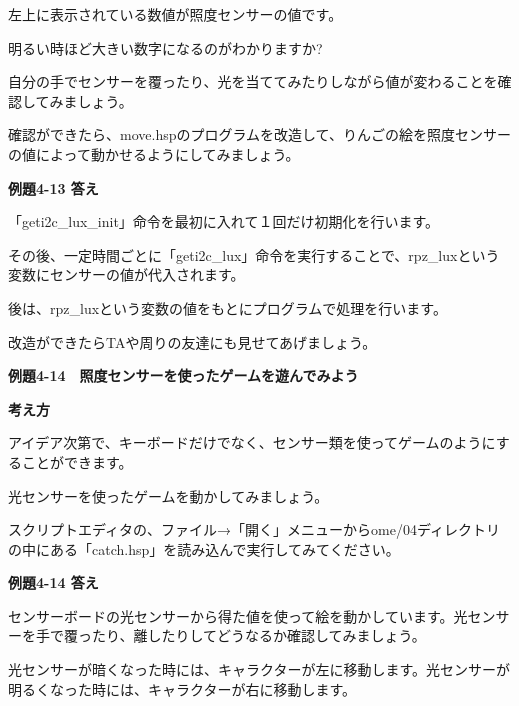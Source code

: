 \documentclass[a4paper,dvipdfmx]{jarticle}
\newcommand\textstyleqwerty[1]{#1}
\begin{document}
\bigskip

左上に表示されている数値が照度センサーの値です。

明るい時ほど大きい数字になるのがわかりますか?

自分の手でセンサーを覆ったり、光を当ててみたりしながら値が変わることを確認してみましょう。


\bigskip

確認ができたら、move.hspのプログラムを改造して、りんごの絵を照度センサーの値によって動かせるようにしてみましょう。


\bigskip

{\bfseries
例題4-13 答え}


\bigskip

「geti2c\_lux\_init」命令を最初に入れて１回だけ初期化を行います。

その後、一定時間ごとに「geti2c\_lux」命令を実行することで、rpz\_luxという変数にセンサーの値が代入されます。

後は、rpz\_luxという変数の値をもとにプログラムで処理を行います。


\bigskip

改造ができたらTAや周りの友達にも見せてあげましょう。

\clearpage
\textstyleqwerty{\textbf{例題4-14　照度センサーを使ったゲームを遊んでみよう}}


\bigskip

{\bfseries
考え方}


\bigskip

アイデア次第で、キーボードだけでなく、センサー類を使ってゲームのようにすることができます。

光センサーを使ったゲームを動かしてみましょう。


\bigskip

スクリプトエディタの、ファイル→「開く」メニューからome/04ディレクトリの中にある「catch.hsp」を読み込んで実行してみてください。


\bigskip


\bigskip

{\bfseries
例題4-14 答え}


\bigskip

センサーボードの光センサーから得た値を使って絵を動かしています。光センサーを手で覆ったり、離したりしてどうなるか確認してみましょう。

光センサーが暗くなった時には、キャラクターが左に移動します。光センサーが明るくなった時には、キャラクターが右に移動します。


\bigskip
\end{document}
